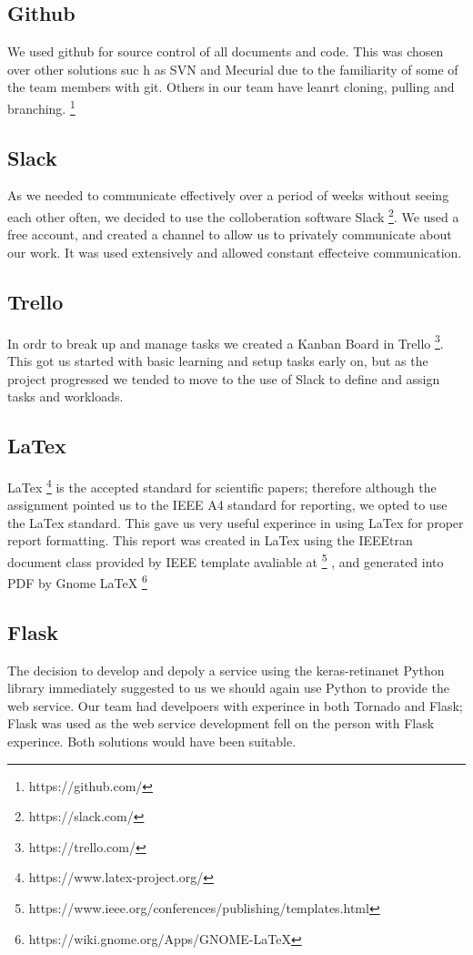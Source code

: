 \documentclass[conference]{IEEEtran}
\begin{document}
\subsection{Github}
We used github for source control of all documents and code. This was chosen over other solutions suc h as SVN and Mecurial due to the familiarity of some of the team members with git. Others in our team have leanrt cloning, pulling and branching. \footnote{https://github.com/}
\subsection{Slack}
As we needed to communicate effectively over a period of weeks without seeing each other often, we decided to use the colloberation software Slack \footnote{https://slack.com/}. We used a free account, and created a channel to allow us to privately communicate about our work. It was used extensively and allowed constant effecteive communication.
\subsection{Trello}
In ordr to break up and manage tasks we created a Kanban Board in Trello \footnote{https://trello.com/}. This got us started with basic learning and setup tasks early on, but as the project progressed we tended to move to the use of Slack to define and assign tasks and workloads.
\subsection{LaTex}
LaTex \footnote{https://www.latex-project.org/} is the accepted standard for scientific papers; therefore although the assignment pointed us to the IEEE A4 standard for reporting, we opted to use the LaTex standard. This gave us very useful experince in using LaTex for proper report formatting.
This report was created in LaTex using the IEEEtran document class provided by IEEE template avaliable at
\footnote{https://www.ieee.org/conferences/publishing/templates.html}
, and generated into PDF by Gnome LaTeX
\footnote{https://wiki.gnome.org/Apps/GNOME-LaTeX}
\subsection{Flask}
The decision to develop and depoly a service using the keras-retinanet Python library immediately suggested to us we should again use Python to provide the web service. Our team had develpoers with experince in both Tornado and Flask; Flask was used as the web service development fell on the person with Flask experince. Both solutions would have been suitable.
\end{document}
